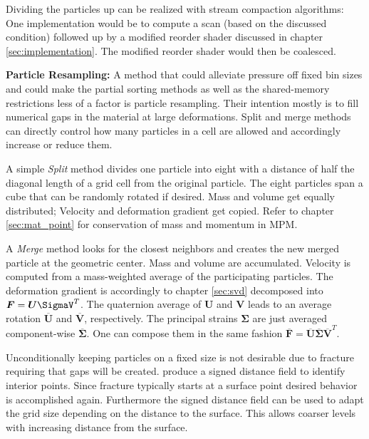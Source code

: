 \documentclass[m,times]{cgMA}
\begin{document}
Dividing the particles up can be realized with stream compaction algorithms: One implementation would be to compute a scan (based on the discussed condition) followed up by a modified reorder shader discussed in chapter \ref{sec:implementation}. The modified reorder shader would then be coalesced.

\textbf{Particle Resampling:} A method that could alleviate pressure off fixed bin sizes and could make the partial sorting methods as well as the shared-memory restrictions less of a factor is particle resampling. Their intention mostly is to fill numerical gaps in the material at large deformations. Split and merge methods can directly control how many particles in a cell are allowed and accordingly increase or reduce them.

A simple \textit{Split} method divides one particle into eight with a distance of half the diagonal length of a grid cell from the original particle. The eight particles span a cube that can be randomly rotated if desired. Mass and volume get equally distributed; Velocity and deformation gradient get copied. Refer to chapter \ref{sec:mat_point} for conservation of mass and momentum in MPM. \cite{gao2017adaptive}

A \textit{Merge} method looks for the closest neighbors and creates the new merged particle at the geometric center. Mass and volume are accumulated. Velocity is computed from a mass-weighted average of the participating particles. The deformation gradient is accordingly to chapter \ref{sec:svd} decomposed into $\boldsymbol{F} = \boldsymbol{U\SigmaV}^T$. The quaternion average of $\boldsymbol{U}$ and $\boldsymbol{V}$ leads to an average rotation $\overline{\boldsymbol{U}}$ and $\overline{\boldsymbol{V}}$, respectively. The principal strains $\boldsymbol{\Sigma}$ are just averaged component-wise $\overline{\boldsymbol{\Sigma}}$. One can compose them in the same fashion $\overline{\boldsymbol{F}} = \overline{\boldsymbol{U}}\overline{\boldsymbol{\Sigma}}\overline{\boldsymbol{V}}^T$.\cite{gao2017adaptive}

Unconditionally keeping particles on a fixed size is not desirable due to fracture requiring that gaps will be created. \cite{gao2017adaptive} produce a signed distance field to identify interior points. Since fracture typically starts at a surface point desired behavior is accomplished again. Furthermore the signed distance field can be used to adapt the grid size depending on the distance to the surface. This allows coarser levels with increasing distance from the surface.
\clearpage
\end{document}
